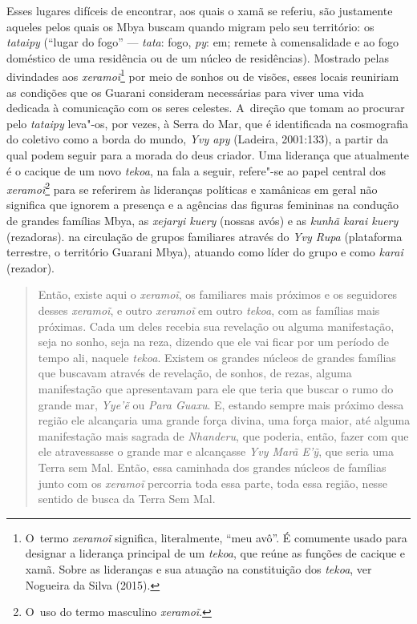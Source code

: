 Esses lugares difíceis de encontrar, aos quais o xamã se referiu, são
justamente aqueles pelos quais os Mbya buscam quando migram pelo seu
território: os \emph{tataipy} (``lugar do fogo'' --- \emph{tata}: fogo,
\emph{py}: em; remete à comensalidade e ao fogo doméstico de uma
residência ou de um núcleo de residências). Mostrado pelas divindades
aos \emph{xeramoĩ}\footnote{O~termo \emph{xeramoĩ} significa,
literalmente, ``meu avô''. É
comumente usado para designar a liderança principal de um \emph{tekoa}, que
reúne as funções de cacique e xamã. Sobre as lideranças e sua atuação
na constituição dos \emph{tekoa}, ver Nogueira da Silva (2015).} por meio de
sonhos ou de visões, esses locais reuniriam as condições que os Guarani
consideram necessárias para viver uma vida dedicada à comunicação com
os seres celestes. A~direção que tomam ao procurar pelo \emph{tataipy}
leva"-os, por vezes, à Serra do Mar, que é identificada na cosmografia
do coletivo como a borda do mundo, \emph{Yvy apy} (Ladeira, 2001:133), a
partir da qual podem seguir para a morada do deus criador. Uma
liderança que atualmente é o cacique de um novo \emph{tekoa}, na fala a
seguir, refere"-se ao papel central dos
\emph{xeramoĩ}\footnote{O~uso do termo masculino
\emph{xeramoĩ}.} para se referirem às lideranças políticas
e xamânicas em geral não significa que ignorem a presença e a agências
das figuras femininas na condução de grandes famílias Mbya, as \emph{xejaryi
kuery} (nossas avós) e as \emph{kunhã karai kuery} (rezadoras). na circulação
de grupos familiares através do \emph{Yvy Rupa} (plataforma terrestre, o
território Guarani Mbya), atuando como líder do grupo e como \emph{karai}
(rezador).

\begin{quote}
Então, existe aqui o \emph{xeramoĩ}, os familiares mais
próximos e os seguidores desses \emph{xeramoĩ}, e outro
\emph{xeramoĩ} em outro \emph{tekoa}, com as famílias mais
próximas. Cada um deles recebia sua revelação ou alguma manifestação,
seja no sonho, seja na reza, dizendo que ele vai ficar por um período
de tempo ali, naquele \emph{tekoa}. Existem os grandes núcleos de grandes
famílias que buscavam através de revelação, de sonhos, de rezas, alguma
manifestação que apresentavam para ele que teria que buscar o rumo do
grande mar, \emph{Yye’\~{e}} ou \emph{Para Guaxu}. E, estando sempre mais próximo
dessa região ele alcançaria uma grande força divina, uma força maior,
até alguma manifestação mais sagrada de \emph{Nhanderu}, que poderia, então,
fazer com que ele atravessasse o grande mar e alcançasse \emph{Yvy Marã
E’ỹ}, que seria uma Terra sem Mal. Então, essa caminhada dos grandes
núcleos de famílias junto com os \emph{xeramoĩ}
percorria toda essa parte, toda essa região, nesse sentido de busca da
Terra Sem Mal.
\end{quote}

